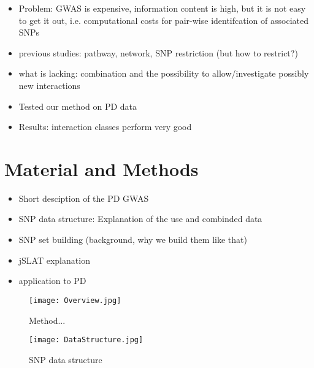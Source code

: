 \documentclass[citeauthoryear]{llncs}
\begin{document}
\begin{itemize}
\item Problem: GWAS is expensive, information content is high, but it is not easy to get it out, i.e. computational costs for pair-wise identifcation of associated SNPs
\item previous studies: pathway, network, SNP restriction (but how to restrict?)
\item what is lacking: combination and the possibility to allow/investigate possibly new interactions
\item Tested our method on PD data
\item Results: interaction classes perform very good
\end{itemize}





\section{Material and Methods}
%

\begin{itemize}
\item Short desciption of the PD GWAS
\item SNP data structure: Explanation of the use and combinded data
\item SNP set building (background, why we build them like that)
\item jSLAT explanation
\item application to PD
\end{itemize}

\begin{figure}[t!h]
\centering \texttt{[image: Overview.jpg]}
\caption{Method...}
\label{fig:Ceramide}
\end{figure}


\begin{figure}[t!h]
\centering \texttt{[image: DataStructure.jpg]}
\caption{SNP data structure}
\label{fig:Ceramide}
\end{figure}
\end{document}
